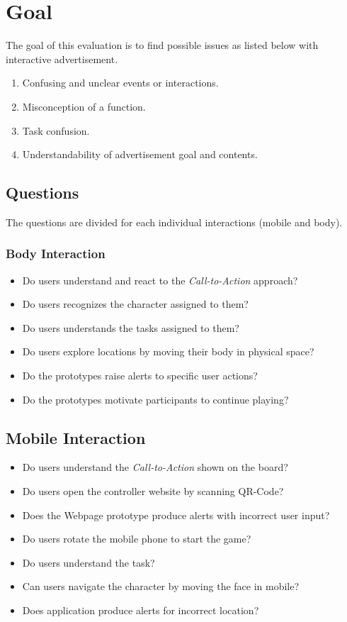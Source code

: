 \section{Goal}
The goal of this evaluation is to find possible issues as listed below with interactive advertisement. 

\begin{enumerate}
\item   Confusing and unclear events or interactions.
\item   Misconception of a function.
\item   Task confusion.
\item   Understandability of advertisement goal and contents.
\end{enumerate}


\subsection{Questions}
The questions are divided for each individual interactions (mobile and body).

\subsubsection{Body Interaction}

\begin{itemize}
\item  Do users understand and react to the \emph{Call-to-Action} approach?
\item  Do users recognizes the character assigned to them?
\item  Do users understands the tasks assigned to them?
\item  Do users explore locations by moving their body in physical space?
\item  Do the prototypes raise alerts to specific user actions?
\item  Do the prototypes motivate participants to continue playing?
\end{itemize}

\subsection{Mobile Interaction}

\begin{itemize}
\item Do users understand the \emph{Call-to-Action} shown on the board?
\item Do users open the controller website by scanning QR-Code?
\item Does the Webpage prototype produce alerts with incorrect user input?
\item Do users rotate the mobile phone to start the game?
\item Do users understand the task?
\item Can users navigate the character by moving the face in mobile?
\item Does application produce alerts for incorrect location?
\end{itemize}


